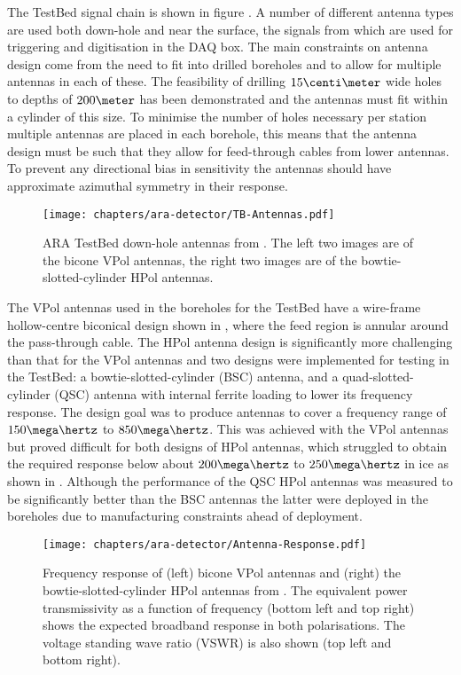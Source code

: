 The TestBed signal chain is shown in figure . A number of different antenna types are used both down-hole and near the surface, the signals from which are used for triggering and digitisation in the DAQ box. The main constraints on antenna design come from the need to fit into drilled boreholes and to allow for multiple antennas in each of these. The feasibility of drilling $15 \centi\meter$ wide holes to depths of $200 \meter$ has been demonstrated and the antennas must fit within a cylinder of this size. To minimise the number of holes necessary per station multiple antennas are placed in each borehole, this means that the antenna design must be such that they allow for feed-through cables from lower antennas. To prevent any directional bias in sensitivity the antennas should have approximate azimuthal symmetry in their response. 

\begin{figure}[htpb]
  \centering
  \texttt{[image: chapters/ara-detector/TB-Antennas.pdf]}
  \caption{ARA TestBed down-hole antennas from  \cite{Allison2012457}. The left two images are of the bicone VPol antennas, the right two images are of the bowtie-slotted-cylinder HPol antennas.}
  \label{fig:ara-detector:TestBed:Antennas}
\end{figure}

The VPol antennas used in the boreholes for the TestBed have a wire-frame hollow-centre biconical design shown in , where the feed region is annular around the pass-through cable. The HPol antenna design is significantly more challenging than that for the VPol antennas and two designs were implemented for testing in the TestBed: a bowtie-slotted-cylinder (BSC) antenna, and a quad-slotted-cylinder (QSC) antenna with internal ferrite loading to lower its frequency response. The design goal was to produce antennas to cover a frequency range of $150 \mega \hertz$ to $850 \mega \hertz$. This was achieved with the VPol antennas but proved difficult for both designs of HPol antennas, which struggled to obtain the required response below about $200 \mega \hertz$ to $250 \mega \hertz$ in ice as shown in . Although the performance of the QSC HPol antennas was measured to be significantly better than the BSC antennas the latter were deployed in the boreholes due to manufacturing constraints ahead of deployment.

\begin{figure}[htpb]
  \centering
  \texttt{[image: chapters/ara-detector/Antenna-Response.pdf]}
  \caption{Frequency response of (left) bicone VPol antennas and (right) the bowtie-slotted-cylinder HPol antennas from \cite{Allison2012457}. The equivalent power transmissivity as a function of frequency  (bottom left and top right) shows the expected broadband response in both polarisations. The voltage standing wave ratio (VSWR) is also shown (top left and bottom right).}
  \label{fig:ara-detector:TestBed:Signal-Chain:Frequency-Response}
\end{figure}



